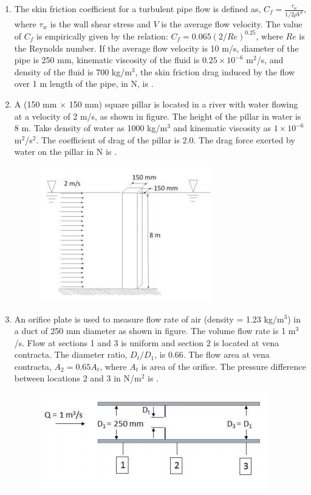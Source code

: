 \documentclass[a4paper,10pt]{article}
\begin{document}
\begin{enumerate}
    \item The skin friction coefficient for a turbulent pipe flow is defined as, $C_f = \frac{\tau_w}{1/2 \rho V^2}$, where $\tau_w$ is the wall shear stress and $V$ is the average flow velocity. The value of $C_f$ is empirically given by the relation: $C_f = 0.065(2/Re)^{0.25}$, where $Re$ is the Reynolds number. If the average flow velocity is 10 m/s, diameter of the pipe is 250 mm, kinematic viscosity of the fluid is $0.25 \times 10^{-6}$ m$^2$/s, and density of the fluid is 700 kg/m$^3$, the skin friction drag induced by the flow over 1 m length of the pipe, in N, is \underline{\hspace{2cm}}.
    \hfill{}

    \item A (150 mm $\times$ 150 mm) square pillar is located in a river with water flowing at a velocity of 2 m/s, as shown in figure. The height of the pillar in water is 8 m. Take density of water as 1000 kg/m$^3$ and kinematic viscosity as $1 \times 10^{-6}$ m$^2$/s$^2$. The coefficient of drag of the pillar is 2.0. The drag force exerted by water on the pillar in N is \underline{\hspace{2cm}}.
    \begin{figure}[H] \centering \includegraphics[width=0.5\columnwidth]{q21_fluid_2018.png} \caption*{} \label{fig:q21_fluid_2018} \end{figure}
    \hfill{}

    \item An orifice plate is used to measure flow rate of air (density = 1.23 kg/m$^3$) in a duct of 250 mm diameter as shown in figure. The volume flow rate is 1 m$^3$/s. Flow at sections 1 and 3 is uniform and section 2 is located at vena contracta. The diameter ratio, $D_t/D_1$, is 0.66. The flow area at vena contracta, $A_2 = 0.65 A_t$, where $A_t$ is area of the orifice. The pressure difference between locations 2 and 3 in N/m$^2$ is \underline{\hspace{2cm}}.
    \begin{figure}[H] \centering \includegraphics[width=0.7\columnwidth]{q22_fluid_2018.png} \caption*{} \label{fig:q22_fluid_2018} \end{figure}
    \hfill{}
\end{enumerate}
\end{document}
